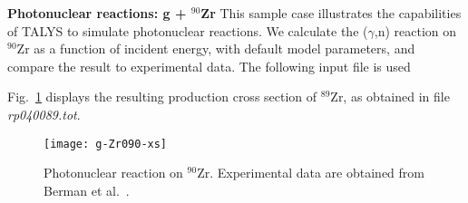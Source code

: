 \begin{samplecase}
{\bf Photonuclear reactions: g + ${}^{90}$Zr}\newline
This sample case illustrates the capabilities of TALYS to simulate photonuclear
reactions. We calculate the ($\gamma$,n) reaction on ${}^{90}$Zr as a function
of incident energy, with default model parameters, and compare the result to
experimental data.
The following input file is used


Fig.~\ref{zr090gn} displays the resulting production cross section of
${}^{89}$Zr, as obtained in file {\em rp040089.tot}.
\end{samplecase}
\begin{figure}
\centering\texttt{[image: g-Zr090-xs]}
\caption{Photonuclear reaction on ${}^{90}$Zr. Experimental data are obtained
from  Berman et al.~\protect\cite{Berman1967}.}
\label{zr090gn}
\end{figure}
